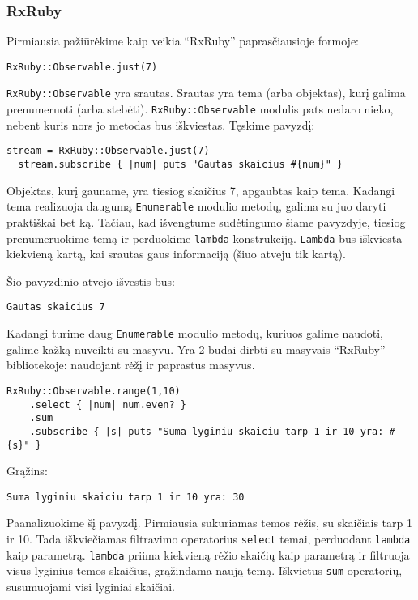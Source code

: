 \subsubsection{RxRuby}

Pirmiausia pažiūrėkime kaip veikia ``RxRuby'' paprasčiausioje formoje:

\begin{lstlisting}[]
  RxRuby::Observable.just(7)
\end{lstlisting}

\lstinline|RxRuby::Observable| yra srautas. Srautas yra tema (arba objektas), kurį galima prenumeruoti (arba stebėti). \lstinline|RxRuby::Observable| modulis pats nedaro nieko, nebent kuris nors jo metodas bus iškviestas. Tęskime pavyzdį:

\begin{lstlisting}[]
  stream = RxRuby::Observable.just(7)
  stream.subscribe { |num| puts "Gautas skaicius #{num}" }
\end{lstlisting}

Objektas, kurį gauname, yra tiesiog skaičius 7, apgaubtas kaip tema. Kadangi tema realizuoja daugumą \lstinline|Enumerable| modulio metodų, galima su juo daryti praktiškai bet ką. Tačiau, kad išvengtume sudėtingumo šiame pavyzdyje, tiesiog prenumeruokime temą ir perduokime \lstinline|lambda| konstrukciją. \lstinline|Lambda| bus iškviesta kiekvieną kartą, kai srautas gaus informaciją (šiuo atveju tik kartą).

Šio pavyzdinio atvejo išvestis bus:

\begin{lstlisting}[]
  Gautas skaicius 7
\end{lstlisting}

Kadangi turime daug \lstinline|Enumerable| modulio metodų, kuriuos galime naudoti, galime kažką nuveikti su masyvu. Yra 2 būdai dirbti su masyvais ``RxRuby'' bibliotekoje: naudojant rėžį ir paprastus masyvus.

\begin{lstlisting}[]
  RxRuby::Observable.range(1,10)
    .select { |num| num.even? }
    .sum
    .subscribe { |s| puts "Suma lyginiu skaiciu tarp 1 ir 10 yra: #{s}" }
\end{lstlisting}

Grąžins:

\begin{lstlisting}[]
  Suma lyginiu skaiciu tarp 1 ir 10 yra: 30
\end{lstlisting}

Paanalizuokime šį pavyzdį. Pirmiausia sukuriamas temos rėžis, su skaičiais tarp 1 ir 10. Tada iškviečiamas filtravimo operatorius \lstinline|select| temai, perduodant \lstinline|lambda| kaip parametrą. \lstinline|lambda| priima kiekvieną rėžio skaičių kaip parametrą ir filtruoja visus lyginius temos skaičius, grąžindama naują temą. Iškvietus \lstinline|sum| operatorių, susumuojami visi lyginiai skaičiai.

